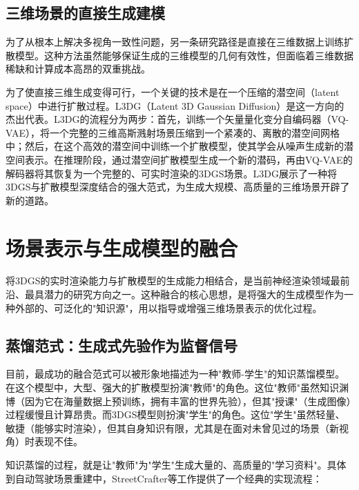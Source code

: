 \subsection{三维场景的直接生成建模}

为了从根本上解决多视角一致性问题，另一条研究路径是直接在三维数据上训练扩散模型。这种方法虽然能够保证生成的三维模型的几何有效性，但面临着三维数据稀缺和计算成本高昂的双重挑战\cite{ho2020denoising}。

为了使直接三维生成变得可行，一个关键的技术是在一个压缩的潜空间（latent space）中进行扩散过程。L3DG（Latent 3D Gaussian Diffusion）是这一方向的杰出代表\cite{rossle2024l3dg}。L3DG的流程分为两步：首先，训练一个矢量量化变分自编码器（VQ-VAE），将一个完整的三维高斯溅射场景压缩到一个紧凑的、离散的潜空间网格中；然后，在这个高效的潜空间中训练一个扩散模型，使其学会从噪声生成新的潜空间表示。在推理阶段，通过潜空间扩散模型生成一个新的潜码，再由VQ-VAE的解码器将其恢复为一个完整的、可实时渲染的3DGS场景\cite{rossle2024l3dg}。L3DG展示了一种将3DGS与扩散模型深度结合的强大范式，为生成大规模、高质量的三维场景开辟了新的道路。

\section{场景表示与生成模型的融合}

将3DGS的实时渲染能力与扩散模型的生成能力相结合，是当前神经渲染领域最前沿、最具潜力的研究方向之一。这种融合的核心思想，是将强大的生成模型作为一种外部的、可泛化的"知识源"，用以指导或增强三维场景表示的优化过程。

\subsection{蒸馏范式：生成式先验作为监督信号}

目前，最成功的融合范式可以被形象地描述为一种"教师-学生"的知识蒸馏模型。在这个模型中，大型、强大的扩散模型扮演"教师"的角色。这位"教师"虽然知识渊博（因为它在海量数据上预训练，拥有丰富的世界先验），但其"授课"（生成图像）过程缓慢且计算昂贵\cite{ho2020denoising}。而3DGS模型则扮演"学生"的角色。这位"学生"虽然轻量、敏捷（能够实时渲染），但其自身知识有限，尤其是在面对未曾见过的场景（新视角）时表现不佳\cite{chen2023pvg}。

知识蒸馏的过程，就是让"教师"为"学生"生成大量的、高质量的"学习资料"。具体到自动驾驶场景重建中，StreetCrafter等工作提供了一个经典的实现流程\cite{shi2025drivex}：

